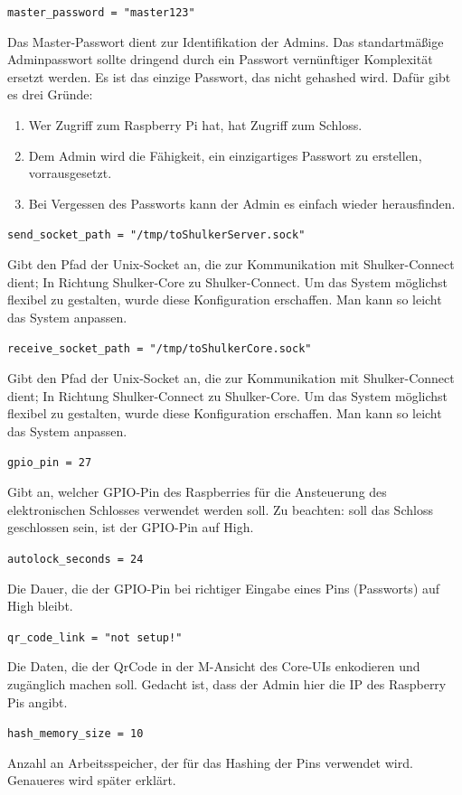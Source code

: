 \lstinline{master_password = "master123"}

Das Master-Passwort dient zur Identifikation der Admins. Das standartmäßige Adminpasswort sollte dringend durch 
ein Passwort vernünftiger Komplexität ersetzt werden. Es ist das einzige Passwort, das nicht gehashed wird. Dafür
gibt es drei Gründe: 
\begin{enumerate}
    \item Wer Zugriff zum Raspberry Pi hat, hat Zugriff zum Schloss.
    \item Dem Admin wird die Fähigkeit, ein einzigartiges Passwort zu erstellen, vorrausgesetzt.
    \item Bei Vergessen des Passworts kann der Admin es einfach wieder herausfinden. 
\end{enumerate}

\lstinline{send_socket_path = "/tmp/toShulkerServer.sock"}

Gibt den Pfad der Unix-Socket an, die zur Kommunikation mit Shulker-Connect dient; In Richtung Shulker-Core zu Shulker-Connect.
Um das System möglichst flexibel zu gestalten, wurde diese Konfiguration erschaffen. Man kann so leicht das System anpassen.

\lstinline{receive_socket_path = "/tmp/toShulkerCore.sock"}

Gibt den Pfad der Unix-Socket an, die zur Kommunikation mit Shulker-Connect dient; In Richtung Shulker-Connect zu Shulker-Core.
Um das System möglichst flexibel zu gestalten, wurde diese Konfiguration erschaffen. Man kann so leicht das System anpassen.

\lstinline{gpio_pin = 27}

Gibt an, welcher GPIO-Pin des Raspberries für die Ansteuerung des elektronischen Schlosses verwendet werden soll. Zu beachten:
soll das Schloss geschlossen sein, ist der GPIO-Pin auf High.

\lstinline{autolock_seconds = 24}

Die Dauer, die der GPIO-Pin bei richtiger Eingabe eines Pins (Passworts) auf High bleibt.

\lstinline{qr_code_link = "not setup!"}

Die Daten, die der QrCode in der M-Ansicht des Core-UIs enkodieren und zugänglich machen soll. Gedacht ist, dass der
Admin hier die IP des Raspberry Pis angibt.

\lstinline{hash_memory_size = 10}

Anzahl an Arbeitsspeicher, der für das Hashing der Pins verwendet wird. Genaueres wird später erklärt.

